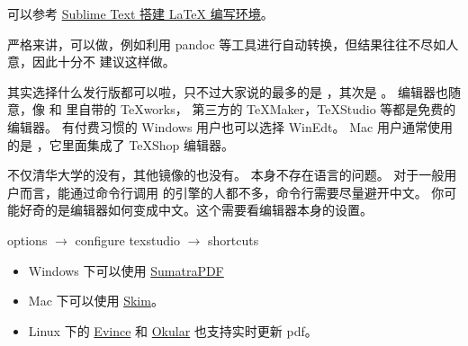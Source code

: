可以参考 \href{https://github.com/EthanDeng/sublime-text-latex}{Sublime Text 搭建 LaTeX 编写环境}。


%



严格来讲，可以做，例如利用 pandoc 等工具进行自动转换，但结果往往不尽如人意，因此十分不
建议这样做。



其实选择什么发行版都可以啦，只不过大家说的最多的是 \TeXLive{}，其次是 \MiKTeX{}。
编辑器也随意，像 \TeXLive{} 和 \MiKTeX{} 里自带的 TeXworks，
第三方的 TeXMaker，TeXStudio 等都是免费的编辑器。
有付费习惯的 Windows 用户也可以选择 WinEdt。
Mac 用户通常使用的是 \MacTeX{}，它里面集成了 TeXShop 编辑器。



不仅清华大学的没有，其他镜像的也没有。\TeXLive{} 本身不存在语言的问题。
对于一般用户而言，能通过命令行调用 \TeXLive{} 的引擎的人都不多，命令行需要尽量避开中文。
你可能好奇的是编辑器如何变成中文。这个需要看编辑器本身的设置。



options $\to$ configure texstudio $\to$ shortcuts



\begin{itemize}
  \item Windows 下可以使用 \href{https://www.sumatrapdfreader.org/free-pdf-reader.html}{SumatraPDF}
  \item Mac 下可以使用 \href{http://skim-app.sourceforge.net/}{Skim}。
  \item Linux 下的 \href{https://gitlab.gnome.org/GNOME/evince}{Evince} 和
  \href{https://okular.kde.org/}{Okular} 也支持实时更新 pdf。
\end{itemize}


